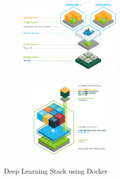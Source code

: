 \documentclass[a4paper]{article}
\begin{document}
\begin{figure}[!h]
	\centering
	\begin{subfigure}{.5\textwidth}
		\centering
		\includegraphics[width=5cm, height=4cm]{./images/nvidia_stack.png}
	\end{subfigure}%
	\begin{subfigure}{.5\textwidth}
		\centering
		\includegraphics[width=5cm, height=4cm]{./images/docker.png}
	\end{subfigure}
	\caption{Deep Learning Stack using Docker}
	\label{fig:deep_learning}
\end{figure}


\end{document}
